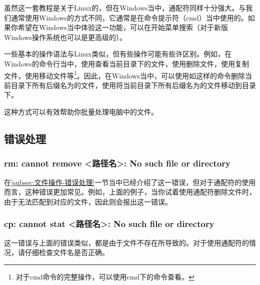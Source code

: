 \begin{extend}
    虽然这一套教程是关于Linux的，但在Windows当中，通配符同样十分强大。与我们通常使用Windows的方式不同，它通常是在命令提示符（cmd）当中使用的。如果你希望在Windows当中体验这一功能，可以在开始菜单搜索（对于新版Windows操作系统也可以是更高级的）。

    一些基本的操作语法与Linux类似，但有些操作可能有些许区别。例如，在Windows的命令行当中，使用查看当前目录下的文件，使用删除文件，使用复制文件，使用移动文件等\footnote{对于cmd命令的完整操作，可以使用cmd下的命令查看。}。因此，在Windows当中，可以使用如这样的命令删除当前目录下所有后缀名为的文件，使用将当前目录下所有后缀名为的文件移动到目录下。

    这种方式可以有效帮助你批量处理电脑中的文件。
\end{extend}

\subsection{错误处理}\label{subsec:通配符-错误处理}

\subsubsection{rm: cannot remove <路径名>: No such file or directory}

在\ref{subsec:文件操作-错误处理}一节当中已经介绍了这一错误，但对于通配符的使用而言，这种错误更加常见。例如，上面的例子，当你试着使用通配符删除文件时，由于无法匹配到对应的文件，因此则会报出这一错误。

\subsubsection{cp: cannot stat <路径名>: No such file or directory}

这一错误与上面的错误类似，都是由于文件不存在所导致的。对于使用通配符的情况，请仔细检查文件名是否正确。